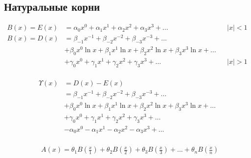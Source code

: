 
\subsection{Натуральные корни}

\begin{equation*} \begin{aligned}
B(x) = E(x) &=
  \alpha_0 x^0
+ \alpha_1 x^1
+ \alpha_2 x^2
+ \alpha_3 x^3
+ \ldots &
&|x| < 1 \\
%
B(x) = D(x) &=   
  \beta_{-1} x^{-1}
+ \beta_{-2} x^{-2}
+ \beta_{-3} x^{-3}
+ \ldots \\ &
+ \beta_0 x^0 \ln{x}
+ \beta_1 x^1 \ln{x}
+ \beta_2 x^2 \ln{x}
+ \beta_3 x^3 \ln{x}
+ \ldots \\ &
+ \gamma_0 x^0
+ \gamma_1 x^1
+ \gamma_2 x^2
+ \gamma_3 x^3
+ \ldots &
&|x| > 1 \\
\end{aligned} \end{equation*}

\begin{equation*} \begin{aligned}
\Upsilon(x) &= D(x) - E(x) \\ &=
  \beta_{-1} x^{-1}
+ \beta_{-2} x^{-2}
+ \beta_{-3} x^{-3}
+ \ldots \\ &
+ \beta_0 x^0 \ln{x}
+ \beta_1 x^1 \ln{x}
+ \beta_2 x^2 \ln{x}
+ \beta_3 x^3 \ln{x}
+ \ldots \\ &
+ \gamma_0 x^0
+ \gamma_1 x^1
+ \gamma_2 x^2
+ \gamma_3 x^3
+ \ldots \\ &
- \alpha_0 x^0
- \alpha_1 x^1
- \alpha_2 x^2
- \alpha_3 x^3
+ \ldots \\
\end{aligned} \end{equation*}

\begin{equation*} \begin{aligned}
&A(x) =
  \theta_1 B{\left(\frac{x}{1} \right)}
+ \theta_2 B{\left(\frac{x}{2} \right)}
+ \theta_3 B{\left(\frac{x}{3} \right)}
+ \ldots
+ \theta_n B{\left(\frac{x}{n} \right)}
\end{aligned} \end{equation*}

